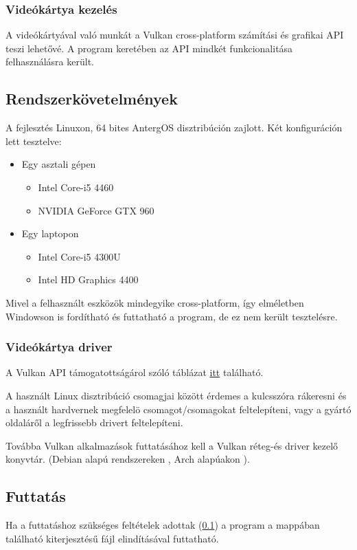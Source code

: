 \subsubsection{Vide\'ok\'artya kezel\'es}
A vide\'ok\'arty\'aval val\'o munk\'at a Vulkan cross-platform sz\'am\'it\'asi \'es grafikai API teszi lehet\H ov\'e. A program keret\'eben az API mindk\'et funkcionalit\'asa felhaszn\'al\'asra ker\"ult.

\subsection{Rendszerk\"ovetelm\'enyek}\label{runrequirements}
A fejleszt\'es Linuxon, 64 bites AntergOS disztrib\'uci\'on zajlott. 
\newline
K\'et konfigur\'aci\'on lett tesztelve:
\begin{itemize}
	\item Egy asztali g\'epen
		\begin{itemize}
			\item Intel Core-i5 4460
			\item NVIDIA GeForce GTX 960
		\end{itemize}
	\item Egy laptopon
		\begin{itemize}
			\item Intel Core-i5 4300U
			\item Intel HD Graphics 4400
		\end{itemize}
\end{itemize}

Mivel a felhaszn\'alt eszk\"oz\"ok mindegyike cross-platform, \'igy elm\'eletben Windowson is ford\'ithat\'o \'es futtathat\'o a program, de ez nem ker\"ult tesztel\'esre.

\subsubsection{Vide\'ok\'artya driver}\label{gpudriver}
A Vulkan API t\'amogatotts\'ag\'arol sz\'ol\'o t\'abl\'azat \href{https://en.wikipedia.org/wiki/Vulkan_(API)\#Compatibility}{itt} tal\'alhat\'o.

A haszn\'alt Linux disztrib\'uci\'o csomagjai k\"oz\"ott \'erdemes a  kulcssz\'ora r\'akeresni \'es a haszn\'alt hardvernek megfelel\"o csomagot/csomagokat feltelep\'iteni, vagy a gy\'art\'o oldal\'ar\H ol a legfrissebb drivert feltelep\'iteni.

Tov\'abba Vulkan alkalmaz\'asok futtat\'as\'ahoz kell a Vulkan r\'eteg-\'es driver kezel\H o konyvt\'ar. (Debian alap\'u rendszereken , Arch alap\'uakon ).

\subsection{Futtat\'as}
Ha a futtat\'ashoz sz\"uks\'eges felt\'etelek adottak (\ref{runrequirements}) a program a  mapp\'aban tal\'alhat\'o  kiterjeszt\'es\H u f\'ajl elind\'it\'as\'aval futtathat\'o. 